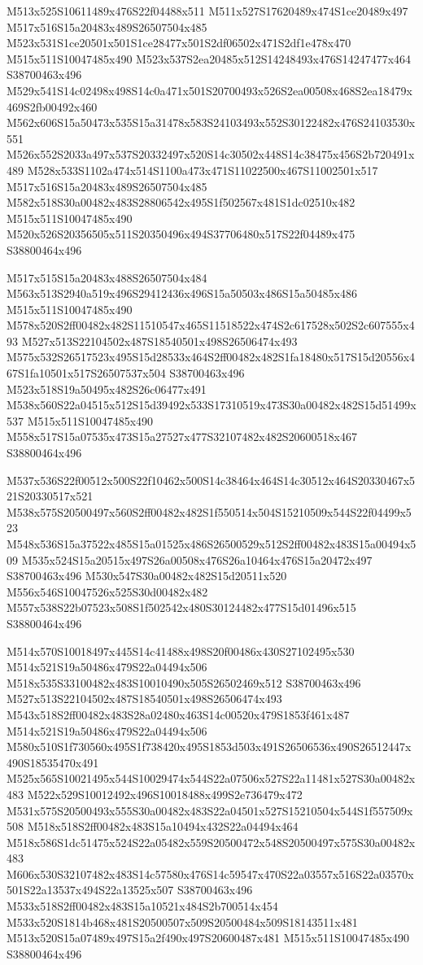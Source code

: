 \documentclass{article}
\begin{document}
\begin{multicols}{2}
M513x525S10611489x476S22f04488x511 M511x527S17620489x474S1ce20489x497 M517x516S15a20483x489S26507504x485 M523x531S1ce20501x501S1ce28477x501S2df06502x471S2df1e478x470 M515x511S10047485x490 M523x537S2ea20485x512S14248493x476S14247477x464 S38700463x496 M529x541S14c02498x498S14c0a471x501S20700493x526S2ea00508x468S2ea18479x469S2fb00492x460 M562x606S15a50473x535S15a31478x583S24103493x552S30122482x476S24103530x551 M526x552S2033a497x537S20332497x520S14c30502x448S14c38475x456S2b720491x489 M528x533S1102a474x514S1100a473x471S11022500x467S11002501x517 M517x516S15a20483x489S26507504x485 M582x518S30a00482x483S28806542x495S1f502567x481S1dc02510x482 M515x511S10047485x490 M520x526S20356505x511S20350496x494S37706480x517S22f04489x475 S38800464x496

M517x515S15a20483x488S26507504x484 M563x513S2940a519x496S29412436x496S15a50503x486S15a50485x486 M515x511S10047485x490 M578x520S2ff00482x482S11510547x465S11518522x474S2c617528x502S2c607555x493 M527x513S22104502x487S18540501x498S26506474x493 M575x532S26517523x495S15d28533x464S2ff00482x482S1fa18480x517S15d20556x467S1fa10501x517S26507537x504 S38700463x496 M523x518S19a50495x482S26c06477x491 M538x560S22a04515x512S15d39492x533S17310519x473S30a00482x482S15d51499x537 M515x511S10047485x490 M558x517S15a07535x473S15a27527x477S32107482x482S20600518x467 S38800464x496

M537x536S22f00512x500S22f10462x500S14c38464x464S14c30512x464S20330467x521S20330517x521 M538x575S20500497x560S2ff00482x482S1f550514x504S15210509x544S22f04499x523 M548x536S15a37522x485S15a01525x486S26500529x512S2ff00482x483S15a00494x509 M535x524S15a20515x497S26a00508x476S26a10464x476S15a20472x497 S38700463x496 M530x547S30a00482x482S15d20511x520 M556x546S10047526x525S30d00482x482 M557x538S22b07523x508S1f502542x480S30124482x477S15d01496x515 S38800464x496

M514x570S10018497x445S14c41488x498S20f00486x430S27102495x530 M514x521S19a50486x479S22a04494x506 M518x535S33100482x483S10010490x505S26502469x512 S38700463x496 M527x513S22104502x487S18540501x498S26506474x493 M543x518S2ff00482x483S28a02480x463S14c00520x479S1853f461x487 M514x521S19a50486x479S22a04494x506 M580x510S1f730560x495S1f738420x495S1853d503x491S26506536x490S26512447x490S18535470x491 M525x565S10021495x544S10029474x544S22a07506x527S22a11481x527S30a00482x483 M522x529S10012492x496S10018488x499S2e736479x472 M531x575S20500493x555S30a00482x483S22a04501x527S15210504x544S1f557509x508 M518x518S2ff00482x483S15a10494x432S22a04494x464 M518x586S1dc51475x524S22a05482x559S20500472x548S20500497x575S30a00482x483 M606x530S32107482x483S14c57580x476S14c59547x470S22a03557x516S22a03570x501S22a13537x494S22a13525x507 S38700463x496 M533x518S2ff00482x483S15a10521x484S2b700514x454 M533x520S1814b468x481S20500507x509S20500484x509S18143511x481 M513x520S15a07489x497S15a2f490x497S20600487x481 M515x511S10047485x490 S38800464x496


\end{multicols}
\end{document}
